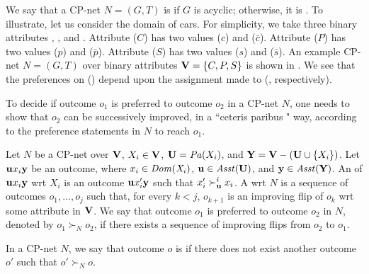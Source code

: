 We say that a CP-net $N=(G,T)$ is  if
$G$ is acyclic; otherwise, it is .
To illustrate, let us consider the domain of cars.
For simplicity, we take three binary attributes
, , and .
Attribute  ($C$) has two values  ($c$) 
and  ($\bar{c}$).
Attribute  ($P$) has two values  ($p$) 
and  ($\bar{p}$).
Attribute  ($S$) has two values  ($s$) 
and  ($\bar{s}$).
An example CP-net $N=(G,T)$ over binary attributes $\textbf{V}=\{C,P,S\}$
is shown in .
We see that the preferences on  () 
depend upon the assignment made
to  (, respectively).

To decide if outcome $o_1$ is preferred to outcome $o_2$ in a CP-net $N$,
one needs to show that $o_2$ can be successively improved, 
in a ``ceteris paribus " way, 
according to the preference statements in $N$ to reach $o_1$.

\begin{definition}
	Let $N$ be a CP-net over $\textbf{V}$, $X_i \in \textbf{V}$, $\textbf{U} = \mathit{Pa}(X_i)$,
	and $\textbf{Y}=\textbf{V}-(\textbf{U} \cup \{X_i\})$.
	Let $\textbf{u} x_i \textbf{y}$ be an outcome, where $x_i\in \it{Dom}(X_i)$,
	$\textbf{u} \in \mathit{Asst}(\textbf{U})$, and $\textbf{y} \in \mathit{Asst}(\textbf{Y})$.
	An  of $\textbf{u} x_i \textbf{y}$ wrt $X_i$ is an
	outcome $\textbf{u} x_i' \textbf{y}$ such that $x_i' \succ^i_{\textbf{u}} x_i$.
	A  wrt $N$ is a sequence of
	outcomes $o_1,\ldots,o_j$ such that, for every $k<j$,
	$o_{k+1}$ is an improving flip of $o_k$ wrt some attribute in $\textbf{V}$.
	We say that outcome $o_1$ is preferred to outcome $o_2$ in $N$,
	denoted by $o_1 \succ_N o_2$, if there exists a sequence of
	improving flips from $o_2$ to $o_1$.
\end{definition}

In a CP-net $N$, we say that outcome $o$ is  if
there does not exist another outcome $o'$ such that
$o' \succ_N o$.


